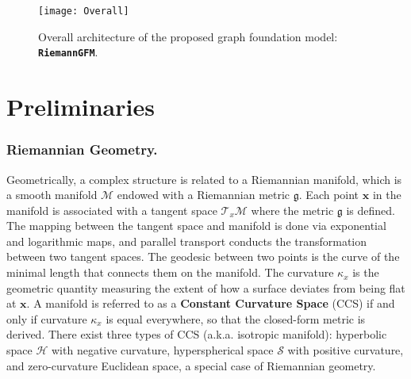 \begin{figure*}
\centering
    \texttt{[image: Overall]}
    \vspace{-0.15in}
        \caption{Overall architecture of the proposed graph foundation model: \textbf{\texttt{RiemannGFM}}.}
    \label{fig:overall}
        \vspace{-0.15in}
\end{figure*}


\vspace{-0.1in}
\section{Preliminaries}


\vspace{-0.05in}
\subsubsection*{\textbf{Riemannian Geometry.}}
Geometrically, a complex structure is related to a Riemannian manifold, which is a smooth manifold $\mathcal M$ endowed with a Riemannian metric $\mathfrak{g}$.
Each point $\boldsymbol x$ in the manifold is associated with a tangent space $\mathcal T_x \mathcal M$ where the metric $\mathfrak{g}$ is defined. 
The mapping between the tangent space and manifold is done via exponential and logarithmic maps,
and parallel transport conducts the transformation between two tangent spaces.
The geodesic between two points is the curve of the minimal length that connects them on the manifold.
The curvature $\kappa_x$ is the geometric quantity measuring the extent of how a surface deviates from being flat at $\boldsymbol x$. 
A manifold is referred to as a \textbf{Constant Curvature Space} (CCS) if and only if curvature $\kappa_x$ is equal everywhere, so that the closed-form metric is derived.
There exist three types of CCS (a.k.a. isotropic manifold): hyperbolic space $\mathcal H$ with negative curvature, hyperspherical space $\mathcal S$ with positive curvature, and zero-curvature Euclidean space,  a special case of Riemannian geometry. 


